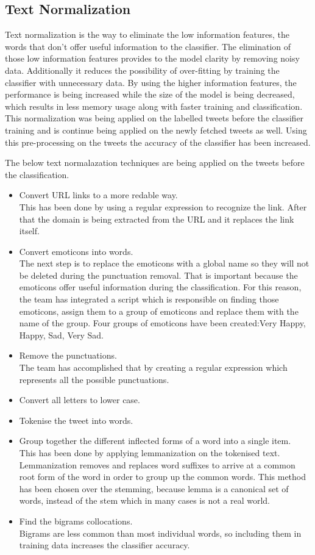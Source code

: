\subsection{Text Normalization}
Text normalization is the way to eliminate the low information features, the words that don't offer useful information to the classifier. The elimination of those low information features provides to the model clarity by removing noisy data. Additionally it reduces the possibility of over-fitting by training the classifier with unnecessary data. By using the higher information features, the performance is being increased while the size of the model is being decreased, which results in less memory usage along with faster training and classification. This normalization was being applied on the labelled tweets before the classifier training and is continue being applied on the newly fetched tweets as well. Using this pre-processing on the tweets the accuracy of the classifier has been increased. 

The below text normalazation techniques are being applied on the tweets before the classification.
\begin{itemize}
\item Convert URL links to a more redable way.\\ 
This has been done by using a regular expression to recognize the link. After that the domain is being extracted from the URL and it replaces the link itself. 
\item Convert emoticons into words.\\ 
The next step is to replace the emoticons with a global name so they will not be deleted during the punctuation removal. That is important because the emoticons offer useful information during the classification. For this reason, the team has integrated a script which is responsible on finding those emoticons, assign them to a group of emoticons and replace them with the name of the group. Four groups of emoticons have been created:Very Happy, Happy, Sad, Very Sad. 
\item Remove the punctuations.\\
The team has accomplished that by creating a regular expression which represents all the possible punctuations. 
\item Convert all letters to lower case.
\item Tokenise the tweet into words.
\item Group together the different inflected forms of a word into a single item.\\
This has been done by applying lemmanization on the tokenised text. Lemmanization removes and replaces word suffixes to arrive at a common root form of the word in order to group up the common words. This method has been chosen over the stemming, because lemma is a canonical set of words, instead of the stem which in many cases is not a real world. 
\item Find the bigrams collocations.\\
Bigrams are less common than most individual words, so including them in training data increases the classifier accuracy. 
\end{itemize}


